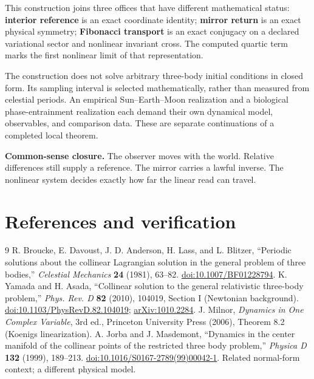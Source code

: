 \documentclass[11pt,letterpaper]{article}
\theoremstyle{paper}
\newcommand{\term}[1]{\textbf{#1}}
\begin{document}
This construction joins three offices that have different mathematical status: \term{interior reference} is an exact coordinate identity; \term{mirror return} is an exact physical symmetry; \term{Fibonacci transport} is an exact conjugacy on a declared variational sector and nonlinear invariant cross. The computed quartic term marks the first nonlinear limit of that representation.

The construction does not solve arbitrary three-body initial conditions in closed form. Its sampling interval is selected mathematically, rather than measured from celestial periods. An empirical Sun--Earth--Moon realization and a biological phase-entrainment realization each demand their own dynamical model, observables, and comparison data. These are separate continuations of a completed local theorem.

\textbf{Common-sense closure.} The observer moves with the world. Relative differences still supply a reference. The mirror carries a lawful inverse. The nonlinear system decides exactly how far the linear read can travel.

\section*{References and verification}
\begin{thebibliography}{9}\setlength{\itemsep}{0.2em}
 R. Broucke, E. Davoust, J. D. Anderson, H. Lass, and L. Blitzer, ``Periodic solutions about the collinear Lagrangian solution in the general problem of three bodies,'' \emph{Celestial Mechanics} \textbf{24} (1981), 63--82. \href{https://doi.org/10.1007/BF01228794}{doi:10.1007/BF01228794}.
 K. Yamada and H. Asada, ``Collinear solution to the general relativistic three-body problem,'' \emph{Phys. Rev. D} \textbf{82} (2010), 104019, Section I (Newtonian background). \href{https://doi.org/10.1103/PhysRevD.82.104019}{doi:10.1103/PhysRevD.82.104019}; \href{https://arxiv.org/abs/1010.2284}{arXiv:1010.2284}.
 J. Milnor, \emph{Dynamics in One Complex Variable}, 3rd ed., Princeton University Press (2006), Theorem 8.2 (Koenigs linearization).
 A. Jorba and J. Masdemont, ``Dynamics in the center manifold of the collinear points of the restricted three body problem,'' \emph{Physica D} \textbf{132} (1999), 189--213. \href{https://doi.org/10.1016/S0167-2789(99)00042-1}{doi:10.1016/S0167-2789(99)00042-1}. Related normal-form context; a different physical model.
\end{thebibliography}
\end{document}
